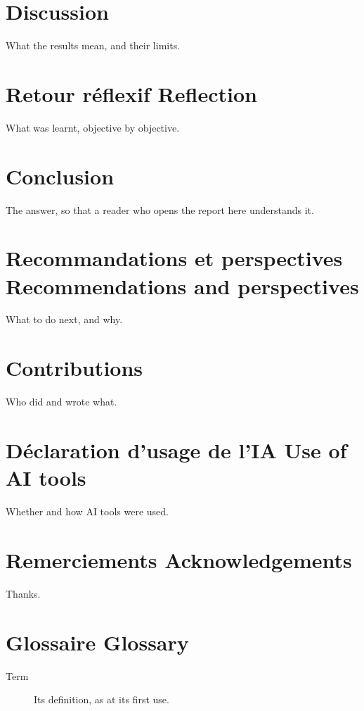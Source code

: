 \documentclass[11pt,a4paper]{article}
\newcommand{\bi}[2]{#1 \textperiodcentered{} #2}
\begin{document}
\section{Discussion}
What the results mean, and their limits.

\section{\bi{Retour réflexif}{Reflection}}
What was learnt, objective by objective.

\section{Conclusion}
The answer, so that a reader who opens the report here understands it.

\section{\bi{Recommandations et perspectives}{Recommendations and perspectives}}
What to do next, and why.

\section*{Contributions}
Who did and wrote what.

\section*{\bi{Déclaration d'usage de l'IA}{Use of AI tools}}
Whether and how AI tools were used.

\section*{\bi{Remerciements}{Acknowledgements}}
Thanks.

\section*{\bi{Glossaire}{Glossary}}
\begin{description}
  \item[Term] Its definition, as at its first use.
\end{description}
\end{document}
